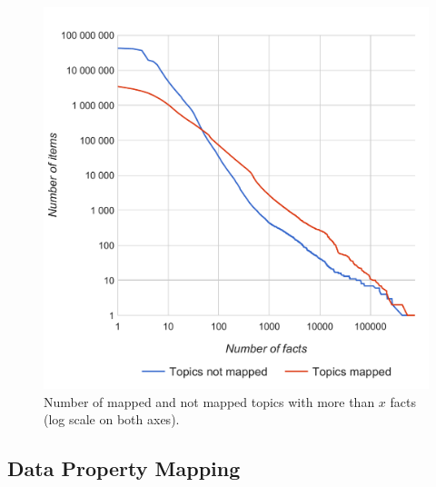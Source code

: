 \documentclass{acm_proc_article-sp}
\begin{document}
\begin{figure}[!htbp]
  \centering
  \includegraphics[width=8.45 cm]{img/facts-topics-mapping.pdf}
  \caption{Number of mapped and not mapped topics with more than $x$ facts (log scale on both axes).}
  \label{fig:mapped-not-mapped}
\end{figure}

\subsection{Data Property Mapping}
\end{document}
